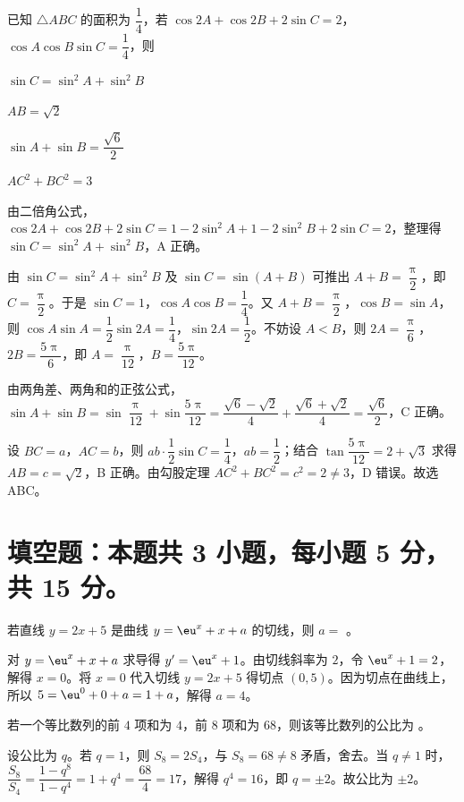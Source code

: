 \documentclass{exam-zh}
\begin{document}
\begin{question}
已知 $\triangle ABC$ 的面积为 $\dfrac{1}{4}$，若 $\cos 2A+\cos 2B+2\sin C=2$，$\cos A\cos B\sin C=\dfrac{1}{4}$，则 \paren[ABC]
\begin{choices}
  \item $\sin C=\sin^{2}A+\sin^{2}B$
  \item $AB=\sqrt{2}$
  \item $\sin A+\sin B=\dfrac{\sqrt{6}}{2}$
  \item $AC^{2}+BC^{2}=3$
\end{choices}
\begin{solution}
由二倍角公式，$\cos 2A+\cos 2B+2\sin C=1-2\sin^{2}A+1-2\sin^{2}B+2\sin C=2$，整理得 $\sin C=\sin^{2}A+\sin^{2}B$，A 正确。

由 $\sin C=\sin^{2}A+\sin^{2}B$ 及 $\sin C=\sin(A+B)$ 可推出 $A+B=\dfrac{\uppi}{2}$，即 $C=\dfrac{\uppi}{2}$。于是 $\sin C=1$，$\cos A\cos B=\dfrac14$。又 $A+B=\dfrac{\uppi}{2}$，$\cos B=\sin A$，则 $\cos A\sin A=\dfrac12\sin 2A=\dfrac14$，$\sin 2A=\dfrac12$。不妨设 $A<B$，则 $2A=\dfrac{\uppi}{6}$，$2B=\dfrac{5\uppi}{6}$，即 $A=\dfrac{\uppi}{12}$，$B=\dfrac{5\uppi}{12}$。

由两角差、两角和的正弦公式，$\sin A+\sin B=\sin\dfrac{\uppi}{12}+\sin\dfrac{5\uppi}{12}=\dfrac{\sqrt6-\sqrt2}{4}+\dfrac{\sqrt6+\sqrt2}{4}=\dfrac{\sqrt6}{2}$，C 正确。

设 $BC=a$，$AC=b$，则 $ab\cdot\dfrac12\sin C=\dfrac14$，$ab=\dfrac12$；结合 $\tan\dfrac{5\uppi}{12}=2+\sqrt3$ 求得 $AB=c=\sqrt2$，B 正确。由勾股定理 $AC^{2}+BC^{2}=c^{2}=2\ne 3$，D 错误。故选 ABC。
\end{solution}
\end{question}

\section{填空题：本题共 3 小题，每小题 5 分，共 15 分。}

\begin{question}
若直线 $y=2x+5$ 是曲线 $y=\eu^{x}+x+a$ 的切线，则 $a=$ \fillin[4] 。
\begin{solution}
对 $y=\eu^{x}+x+a$ 求导得 $y'=\eu^{x}+1$。由切线斜率为 $2$，令 $\eu^{x}+1=2$，解得 $x=0$。将 $x=0$ 代入切线 $y=2x+5$ 得切点 $(0,5)$。因为切点在曲线上，所以 $5=\eu^{0}+0+a=1+a$，解得 $a=4$。
\end{solution}
\end{question}

\begin{question}
若一个等比数列的前 $4$ 项和为 $4$，前 $8$ 项和为 $68$，则该等比数列的公比为 \fillin[{$\pm 2$}] 。
\begin{solution}
设公比为 $q$。若 $q=1$，则 $S_{8}=2S_{4}$，与 $S_{8}=68\ne 8$ 矛盾，舍去。当 $q\ne 1$ 时，$\dfrac{S_{8}}{S_{4}}=\dfrac{1-q^{8}}{1-q^{4}}=1+q^{4}=\dfrac{68}{4}=17$，解得 $q^{4}=16$，即 $q=\pm 2$。故公比为 $\pm 2$。
\end{solution}
\end{question}
\end{document}
